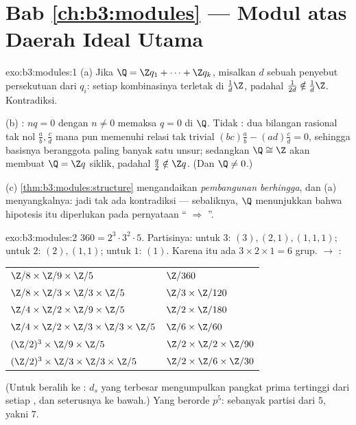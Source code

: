 \section*{Bab \ref{ch:b3:modules} --- Modul atas Daerah Ideal
Utama}

\begin{solution}{exo:b3:modules:1}
(a) Jika $\Q = \Z q_1 + \dots + \Z q_k$, misalkan $d$ sebuah penyebut
persekutuan dari $q_i$: setiap kombinasinya terletak di $\frac1d\Z$,
padahal $\frac1{2d} \notin \frac1d\Z$. Kontradiksi.

(b)  : $nq = 0$ dengan $n \neq 0$ memaksa $q = 0$ di
$\Q$. Tidak : dua bilangan rasional tak nol $\frac ab, \frac cd$ mana pun
memenuhi relasi tak trivial $(bc)\frac ab - (ad)\frac cd =
0$, sehingga basisnya beranggota paling banyak satu unsur; sedangkan $\Q \cong \Z$ akan membuat
$\Q = \Z q$ siklik, padahal $\frac q2 \notin \Z q$. (Dan $\Q \neq
0$.)

(c) \cref{thm:b3:modules:structure} mengandaikan \emph{pembangunan
berhingga}, dan (a) menyangkalnya: jadi tak ada kontradiksi --- sebaliknya, $\Q$
menunjukkan bahwa hipotesis itu diperlukan pada pernyataan
``  $\Rightarrow$ ''.
\end{solution}

\begin{solution}{exo:b3:modules:2}
$360 = 2^3\cdot3^2\cdot5$. Partisinya: untuk $3$: $(3), (2,1),
(1,1,1)$; untuk $2$: $(2), (1,1)$; untuk $1$: $(1)$. Karena itu ada $3 \times 2
\times 1 = 6$ grup.  $\to$ :
\begin{center}
\begin{tabular}{l l}
$\Z/8 \times \Z/9 \times \Z/5$ & $\Z/360$\\
$\Z/8 \times \Z/3 \times \Z/3 \times \Z/5$ & $\Z/3 \times
\Z/120$\\
$\Z/4 \times \Z/2 \times \Z/9 \times \Z/5$ & $\Z/2 \times
\Z/180$\\
$\Z/4 \times \Z/2 \times \Z/3 \times \Z/3 \times \Z/5$ & $\Z/6
\times \Z/60$\\
$(\Z/2)^3 \times \Z/9 \times \Z/5$ & $\Z/2 \times \Z/2 \times
\Z/90$\\
$(\Z/2)^3 \times \Z/3 \times \Z/3 \times \Z/5$ & $\Z/2 \times
\Z/6 \times \Z/30$
\end{tabular}
\end{center}
(Untuk beralih ke : $d_s$ yang terbesar mengumpulkan
pangkat prima tertinggi dari setiap , dan seterusnya ke bawah.) Yang berorde
$p^5$: sebanyak partisi dari $5$, yakni $7$.
\end{solution}

